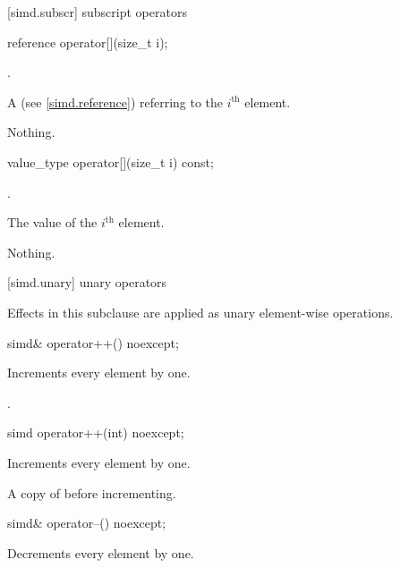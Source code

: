 \begin{wgText}
[simd.subscr]{ subscript operators}

\begin{itemdecl}
reference operator[](size_t i);
\end{itemdecl}

\begin{itemdescr}
  \pnum\requires
  .

  \pnum\returns
  A  (see \ref{simd.reference}) referring to the $i^\text{th}$ element.

  \pnum\throws Nothing.
\end{itemdescr}

\begin{itemdecl}
value_type operator[](size_t i) const;
\end{itemdecl}

\begin{itemdescr}
  \pnum\requires
  .

  \pnum\returns
  The value of the $i^\text{th}$ element.

  \pnum\throws Nothing.
\end{itemdescr}

[simd.unary]{ unary operators}

\pnum
Effects in this subclause are applied as unary element-wise operations.

\begin{itemdecl}
simd& operator++() noexcept;
\end{itemdecl}

\begin{itemdescr}
  \pnum\effects
  Increments every element by one.

  \pnum\returns
  .
\end{itemdescr}

\begin{itemdecl}
simd operator++(int) noexcept;
\end{itemdecl}

\begin{itemdescr}
  \pnum\effects
  Increments every element by one.

  \pnum\returns
  A copy of  before incrementing.
\end{itemdescr}

\begin{itemdecl}
simd& operator--() noexcept;
\end{itemdecl}

\begin{itemdescr}
  \pnum\effects
  Decrements every element by one.


\end{itemdescr}
\end{wgText}
